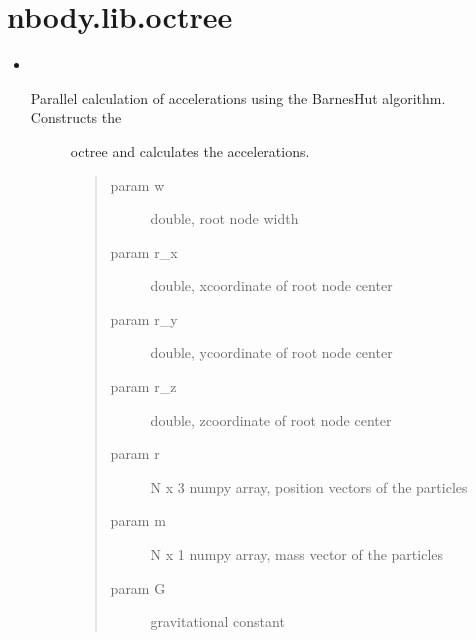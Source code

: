 \documentclass[letterpaper,10pt,english]{sphinxmanual}
\begin{document}
\section{nbody.lib.octree}
\label{\detokenize{octree:nbody-lib-octree}}\label{\detokenize{octree::doc}}\begin{itemize}
\item {} 

\begin{fulllineitems}
\label{\detokenize{octree:nbody.lib.octree.calc_accs_octree}}~\begin{description}
\item[{Parallel calculation of accelerations using the Barnes\sphinxhyphen{}Hut algorithm. Constructs the}] \leavevmode
\sphinxAtStartPar
octree and calculates the accelerations.
\begin{quote}\begin{description}
\item[{param w}] \leavevmode
\sphinxAtStartPar
double, root node width

\item[{param r\_x}] \leavevmode
\sphinxAtStartPar
double, x\sphinxhyphen{}coordinate of root node center

\item[{param r\_y}] \leavevmode
\sphinxAtStartPar
double, y\sphinxhyphen{}coordinate of root node center

\item[{param r\_z}] \leavevmode
\sphinxAtStartPar
double, z\sphinxhyphen{}coordinate of root node center

\item[{param r}] \leavevmode
\sphinxAtStartPar
N x 3 numpy array, position vectors of the particles

\item[{param m}] \leavevmode
\sphinxAtStartPar
N x 1 numpy array, mass vector of the particles

\item[{param G}] \leavevmode
\sphinxAtStartPar
gravitational constant


\end{description}
\end{quote}
\end{description}
\end{fulllineitems}
\end{itemize}
\end{document}
